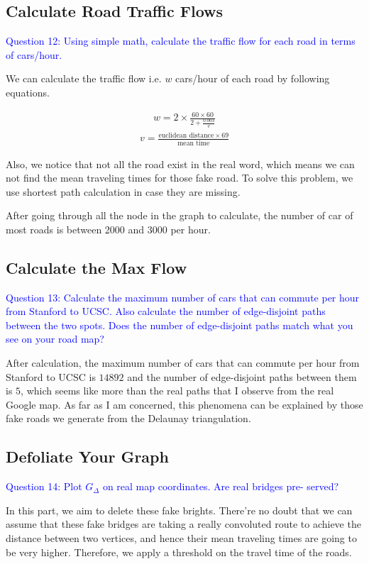 \documentclass[11pt]{article}
\begin{document}
\subsection{Calculate Road Traffic Flows}

\textcolor{blue}{
Question 12: Using simple math, calculate the traffic flow for each road in terms of cars/hour.
}

We can calculate the traffic flow i.e. $w$ cars/hour of each road by following equations.

\begin{align}
w = 2 \times \frac{60 \times 60}{2 + \frac{0.003}{v}}
\end{align}
\begin{align}
v = \frac{ \text{euclidean distance} \times 69}{ \text{mean time}}
\end{align}

Also, we notice that not all the road exist in the real word, which means we can not find the mean traveling times for those fake road. To solve this problem, we use shortest path calculation in case they are missing.

After going through all the node in the graph to calculate, the number of car of most roads is between 2000 and 3000 per hour.

\subsection{Calculate the Max Flow}
\textcolor{blue}{
Question 13: Calculate the maximum number of cars that can commute per hour from Stanford to UCSC. Also calculate the number of edge-disjoint paths between the two spots. Does the number of edge-disjoint paths match what you see on your road map?
}

After calculation, the maximum number of cars that can commute per hour from Stanford to UCSC is $14892$ and the number of edge-disjoint paths between them is $5$, which seems like more than the real paths that I observe from the real Google map. As far as I am concerned, this phenomena can be explained by those fake roads we generate from the Delaunay triangulation.

\subsection{Defoliate Your Graph}
\textcolor{blue}{
Question 14: Plot $G_{\Delta}$ on real map coordinates. Are real bridges pre- served?
}

In this part, we aim to delete these fake brights. There're no doubt that we can assume that these fake bridges are taking a really convoluted route to achieve the distance between two vertices, and hence their mean traveling times are going to be very higher. Therefore, we apply a threshold on the travel time of the roads.
\end{document}
